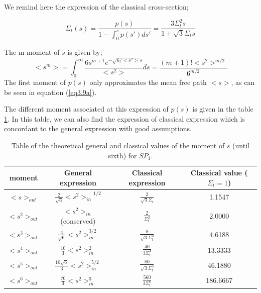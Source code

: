 \documentclass[a4paper, 12pt]{report}
\newcommand{\bl}{\big<}
\newcommand{\bg}{\big>}
\begin{document}
We remind here the expression of the classical cross-section;

\begin{equation}
\Sigma_t(s) = \frac{p(s)}{1-\int_0^s p(s')ds'} = \frac{3 \Sigma_t^2 s}{1+ \sqrt{3}\Sigma_t s}
\end{equation}
  

The m-moment of $s$ is given by;
\begin{subequations}\label{eq3.9}
\begin{equation}
\bl s^m \bg =\int_0^\infty \frac{6s^{m+1}e^{-\sqrt{6/<s^2>}s}}{\bl s^2\bg} ds = \frac{(m+1)! \bl s^2 \bg^{m/2}}{6^{m/2}}
\end{equation}
\end{subequations}
The first moment of $p(s)$ only approximates the mean free path $\bl s \bg$, as can be seen in equation (\ref{eq3.9a}).

The different moment associated at this expression of $p(s)$ is given in the table \ref{momentnsp1}. In this table, we can also find the expression of classical expression which is concordant to the general expression with good assumptions.

\begin{center}
\begin{table}
\begin{center}
\begin{tabular}{|c|c|c|c|}
\hline
moment & General expression & Classical expression & Classical value ($\Sigma_t=1$)  \\ \hline
$\bl s \bg_{out}$ &$ \frac{2}{\sqrt{6}}{\bl s^2 \bg_{in}}^{1/2}$ &$ \frac{2}{\sqrt{3}\Sigma_t}$ & 1.1547 \\ \hline
$\bl s^2 \bg_{out}$ & $\bl s^2 \bg_{in}$ (conserved)& $\frac{2}{\Sigma_t^2}$ & 2.0000 \\ \hline
$\bl s^3 \bg_{out}$ &$ \frac{4}{\sqrt{6}}{\bl s^2 \bg_{in}^{3/2}}$&$ \frac{8}{\sqrt{3}\Sigma_t^3}$ & 4.6188 \\ \hline
$\bl s^4 \bg_{out}$ &$ \frac{10}{3}\bl s^2 \bg_{in}^2$&$ \frac{40}{3 \Sigma_t^4}$ & 13.3333 \\ \hline
$\bl s^5 \bg_{out}$ &$ \frac{10\sqrt{6}}{3}{\bl s^2 \bg_{in}^{5/2}}$  &$ \frac{80}{\sqrt{3}\Sigma_t^5}$ & 46.1880 \\ \hline
$\bl s^6 \bg_{out}$ &$ \frac{70}{3}\bl s^2 \bg_{in}^3$&$ \frac{560}{3 \Sigma_t^6}$ & 186.6667   \\ \hline
\end{tabular}
\caption{\label{momentnsp1} Table of the theoretical general and classical values of the moment of $s$ (until sixth) for $SP_1$. }
\end{center}
\end{table}
\end{center}
\end{document}
